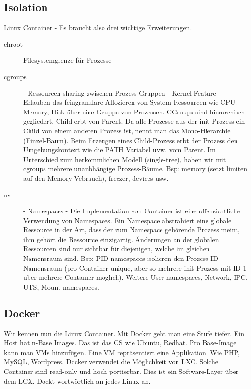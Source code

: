 \subsection{Isolation}
Linux Container - Es braucht also drei wichtige Erweiterungen.
\begin{description}
	\item[chroot] Filesystemgrenze für Prozesse
	\item[cgroups] - Ressourcen sharing zwischen Prozess Gruppen - Kernel Feature - Erlauben das feingranulare Allozieren von System Ressourcen wie CPU, Memory, Disk über eine Gruppe von Prozessen. CGroups sind hierarchisch gegliedert. Child erbt von Parent. Da alle Prozesse aus der init-Prozess ein Child von einem anderen Prozess ist, nennt man das Mono-Hierarchie (Einzel-Baum).  Beim Erzeugen eines Child-Prozess erbt der Prozess den Umgebungskontext wie die PATH Variabel uvw. vom Parent. Im Unterschied zum herkömmlichen Modell (single-tree), haben wir mit cgroups mehrere unanbhängige Prozess-Bäume. Bsp: memory (setzt limiten auf den Memory Vebrauch), freezer, devices usw.
	\item[ns] - Namespaces - Die Implementation von Container ist eine offensichtliche Verwendung von Namespaces. Ein Namespace abstrahiert eine globale Ressource in der Art, dass der zum Namespace gehörende Prozess meint, ihm gehört die Ressource einzigartig. Änderungen an der globalen Ressourcen sind nur sichtbar für diejenigen, welche im gleichen Namensraum sind. Bsp: PID namespaces isolieren den Prozess ID Namensraum (pro Container unique, aber so mehrere init Prozess mit ID 1 über mehrere Container möglich). Weitere User namespaces, Network, IPC, UTS, Mount namespaces.
\end{description} 

\subsection{Docker}
Wir kennen nun die Linux Container. Mit Docker geht man eine Stufe tiefer. Ein Host hat n-Base Images. Das ist das OS wie Ubuntu, Redhat. Pro Base-Image kann man VMs hinzufügen. Eine VM repräsentiert eine Applikation. Wie PHP, MySQL, Wordpress. Docker verwendet die Möglichkeit von LXC. Solche Container sind read-only und hoch portierbar. Dies ist ein Software-Layer über dem LCX. Dockt wortwörtlich an jedes Linux an.